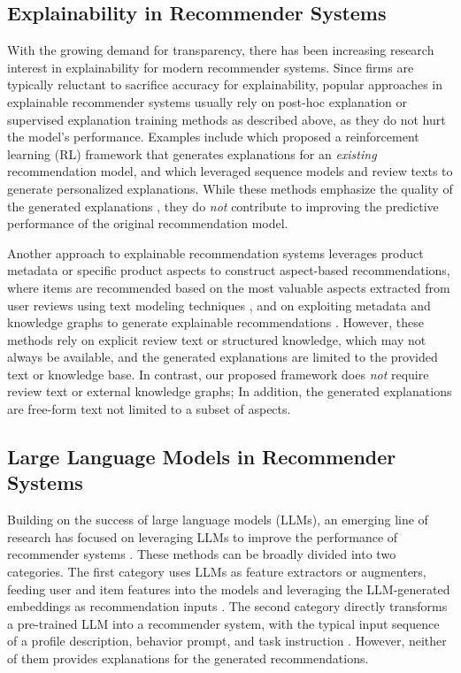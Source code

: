 \subsection{Explainability in Recommender Systems}
With the growing demand for transparency, there has been increasing research interest in explainability for modern recommender systems. Since firms are typically reluctant to sacrifice accuracy for explainability, popular approaches in explainable recommender systems usually rely on post-hoc explanation or supervised explanation training methods as described above, as they do not hurt the model's performance. Examples include \citet{wang2018reinforcement} which proposed a reinforcement learning (RL) framework that generates explanations for an \emph{existing} recommendation model, and \citep{li2021personalized} which leveraged sequence models and review texts to generate personalized explanations. While these methods emphasize the quality of the generated explanations \citep{costa2018automatic}, they do \emph{not} contribute to improving the predictive performance of the original recommendation model.

Another approach to explainable recommendation systems leverages product metadata or specific product aspects to construct aspect-based recommendations, where items are recommended based on the most valuable aspects extracted from user reviews using text modeling techniques \citep{bauman2017aspect, cheng20183ncf, cheng2019mmalfm, chin2018anr, guan2019attentive, le2021explainable, li2023prompt}, and on exploiting metadata and knowledge graphs to generate explainable recommendations \citep{lee2018explainable, wang2019explainable}. However, these methods rely on explicit review text or structured knowledge, which may not always be available, and the generated explanations are limited to the provided text or knowledge base. In contrast, our proposed framework does \emph{not} require review text or external knowledge graphs; In addition, the generated explanations are free-form text not limited to a subset of aspects.

\subsection{Large Language Models in Recommender Systems}
Building on the success of large language models (LLMs), an emerging line of research has focused on leveraging LLMs to improve the performance of recommender systems \citep{wu2024survey}. These methods can be broadly divided into two categories. The first category uses LLMs as feature extractors or augmenters, feeding user and item features into the models and leveraging the LLM-generated embeddings as recommendation inputs \citep{peng2023gpt, ren2024representation, wang2024llm}. The second category directly transforms a pre-trained LLM into a recommender system, with the typical input sequence of a profile description, behavior prompt, and task instruction \citep{he2023large, huang2023recommender, wang2024rethinking, zhai2024actions}. However, neither of them provides explanations for the generated recommendations. 

